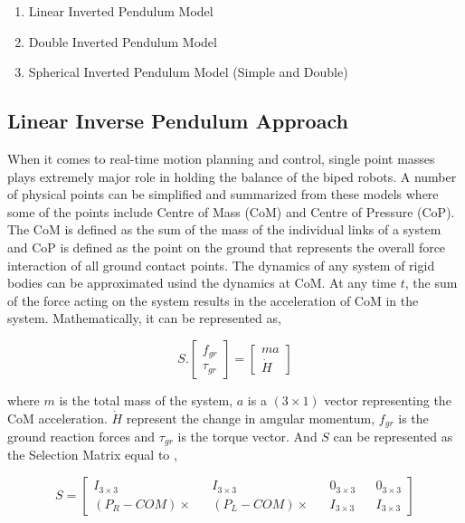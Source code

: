 \begin{enumerate}
    \item Linear Inverted Pendulum Model
    \item Double Inverted Pendulum Model
    \item Spherical Inverted Pendulum Model (Simple and Double)
\end{enumerate}


\subsection{Linear Inverse Pendulum Approach}
\label{sec: LIPM}
When it comes to real-time motion planning and control, single point masses plays extremely major role in holding the balance of the biped robots. A number of physical points can be simplified and summarized from 
these models where some of the points include Centre of Mass (CoM) and Centre of Pressure (CoP). The CoM is defined as the sum of the mass of the individual links of a system and CoP is defined as the point on the 
ground that represents the overall force interaction of all ground contact points. The dynamics of any system of rigid bodies can be approximated usind the dynamics at CoM. At any time $t$, the sum of the force acting 
on the system results in the acceleration of CoM in the system. Mathematically, it can be represented as,


\begin{equation}
    \label{eq: scaling-pendulum}
    S.\begin{bmatrix}
        f_{gr} \\
        \tau_{gr}
    \end{bmatrix} = 
    \begin{bmatrix}
        ma \\
        \dot{H}
    \end{bmatrix}
\end{equation}


where $m$ is the total mass of the system, $a$ is a $(3 \times 1)$ vector representing the CoM acceleration. $\dot{H}$ represent the change in amgular momentum, $f_{gr}$ is the ground reaction forces and $\tau_{gr}$ is the torque vector. And $S$ can be represented as the 
Selection Matrix equal to \cite{elhasairi2015humanoid}, 


\begin{equation}
    S = \begin{bmatrix}
        I_{3 \times 3} && I_{3 \times 3} && 0_{3 \times 3} && 0_{3 \times 3} \\
        (P_R - COM)\times && (P_L - COM)\times && I_{3 \times 3} && I_{3 \times 3}
    \end{bmatrix}
\end{equation}

